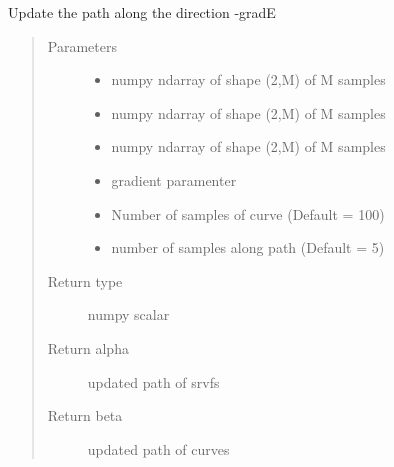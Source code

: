 \documentclass[letterpaper,10pt,english]{sphinxmanual}
\begin{document}

\begin{fulllineitems}
\label{\detokenize{geodesic:geodesic.update_path}}
Update the path along the direction -gradE
\begin{quote}\begin{description}
\item[{Parameters}] \leavevmode\begin{itemize}
\item {} 
 \textendash{} numpy ndarray of shape (2,M) of M samples

\item {} 
 \textendash{} numpy ndarray of shape (2,M) of M samples

\item {} 
 \textendash{} numpy ndarray of shape (2,M) of M samples

\item {} 
 \textendash{} gradient paramenter

\item {} 
 \textendash{} Number of samples of curve (Default = 100)

\item {} 
 \textendash{} number of samples along path (Default = 5)

\end{itemize}

\item[{Return type}] \leavevmode
numpy scalar

\item[{Return alpha}] \leavevmode
updated path of srvfs

\item[{Return beta}] \leavevmode
updated path of curves

\end{description}\end{quote}

\end{fulllineitems}
\end{document}
